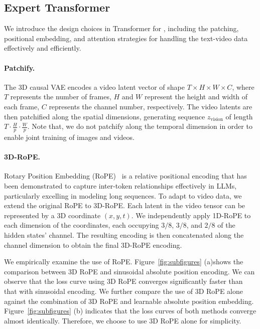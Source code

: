 
\subsection{Expert Transformer}\label{sec:expert-transformer}

We introduce the design choices in Transformer for \model, including the patching, positional embedding, and attention strategies for handling the text-video data effectively and efficiently. 

\paragraph{Patchify.}
The 3D causal VAE encodes a video latent vector of shape $T \times H \times W \times C$, where $T$ represents the number of frames, $H$ and $W$ represent the height and width of each frame, $C$ represents the channel number, respectively.
The video latents are then patchified  along the spatial dimensions, generating sequence $z_{\text{vision}}$ of length $T\cdot \frac{H}{p} \cdot \frac{W}{p}$. 
Note that, we do not patchify along the temporal dimension in order to enable joint training of images and videos.

\paragraph{3D-RoPE.}
Rotary Position Embedding (RoPE)~\citep{su2024roformer} is a relative positional encoding that has been demonstrated to capture inter-token relationships effectively in LLMs, particularly excelling in modeling long sequences. 
To adapt to video data, we extend the original RoPE to 3D-RoPE. 
Each latent in the video tensor can be represented by a 3D coordinate $(x, y, t)$.
We independently apply 1D-RoPE to each dimension of the coordinates, each occupying $3/8$, $3/8$, and $2/8$ of the hidden states' channel. 
The resulting encoding is then concatenated along the channel dimension to obtain the final 3D-RoPE encoding. 

We empirically examine the use of RoPE. 
Figure~\ref{fig:subfigures} (a)shows the comparison between 3D RoPE and sinusoidal absolute position encoding. 
We can observe that the loss curve using 3D RoPE converges significantly faster than that with sinusoidal encoding. 
We further compare the use of 3D RoPE alone against the combination of 3D RoPE and learnable absolute position embedding. 
Figure~\ref{fig:subfigures} (b) indicates that the loss curves of both methods converge almost identically. 
Therefore, we choose to use 3D RoPE alone for simplicity. 


